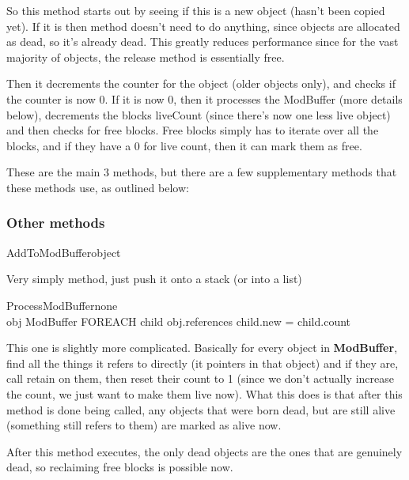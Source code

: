 \documentclass{article}
\begin{document}
So this method starts out by seeing if this is a new object (hasn't been copied yet). If it is then  method doesn't need to do anything, since objects are allocated as dead, so it's already dead. This greatly reduces performance since for the vast majority of objects, the release method is essentially free.

Then it decrements the counter for the object (older objects only), and checks if the counter is now 0. If it is now 0, then it processes the ModBuffer (more details below), decrements the blocks liveCount (since there's now one less live object) and then checks for free blocks. Free blocks simply has to iterate over all the blocks, and if they have a 0 for live count, then it can mark them as free.

These are the main 3 methods, but there are a few supplementary methods that these methods use, as outlined below:

\subsubsection{Other methods}

\begin{pseudocode}{AddToModBuffer}{object}
	\\
\end{pseudocode}

Very simply method, just push it onto a stack (or into a list)

\begin{pseudocode}{ProcessModBuffer}{none}
	\\
	\FOREACH obj \in ModBuffer \DO
	\BEGIN
		FOREACH child \in obj.references \DO
		\BEGIN
			\IF child.new = \TRUE \THEN 
			\BEGIN
				child.count 
			\END
		\END
	\END
\end{pseudocode}

This one is slightly more complicated. Basically for every object in \textbf{ModBuffer}, find all the things it refers to directly (it pointers in that object) and if they are, call retain on them, then reset their count to 1 (since we don't actually increase the count, we just want to make them live now). What this does is that after this method is done being called, any objects that were born dead, but are still alive (something still refers to them) are marked as alive now. 

After this method executes, the only dead objects are the ones that are genuinely dead, so reclaiming free blocks is possible now.
\end{document}
